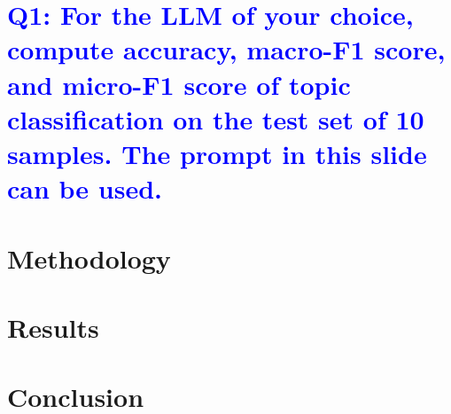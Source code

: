 \documentclass{article}
\begin{document}
\section{\textcolor{blue}{\large \bf Q1: For the LLM of your choice, compute accuracy, macro-F1 score,
and micro-F1 score of topic classification on the test set of 10
samples. The prompt in this slide can be used.}}


\section{Methodology}


\section{Results}


\section{Conclusion}
\end{document}
